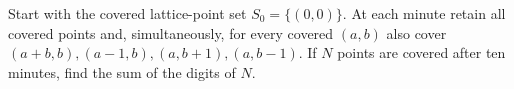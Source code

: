 Start with the covered lattice-point set $S_0=\{(0,0)\}$. At each minute retain all covered points and, simultaneously, for every covered $(a,b)$ also cover $(a+b,b),(a-1,b),(a,b+1),(a,b-1)$. If $N$ points are covered after ten minutes, find the sum of the digits of $N$.
